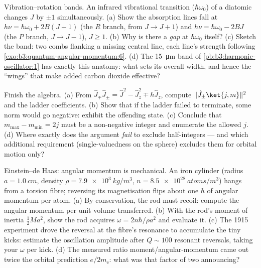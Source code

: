 \begin{exercise}[$\star\star\star$]\label{exo:b3:quantum-angular-momentum:10}
Vibration--rotation bands. An infrared vibrational transition
($\hbar\omega_0$) of a diatomic changes $J$ by $\pm1$
simultaneously. (a) Show the absorption lines fall at $h\nu =
\hbar\omega_0 + 2B(J+1)$ (the $R$ branch, from $J \to J+1$) and
$h\nu = \hbar\omega_0 - 2BJ$ (the $P$ branch, $J \to J-1$), $J \ge
1$. (b) Why is there a \emph{gap} at $\hbar\omega_0$ itself? (c)
Sketch the band: two combs flanking a missing central line, each
line's strength following
\cref{exo:b3:quantum-angular-momentum:6}. (d) The
\qty{15}{\micro m} band of \cref{pb:b3:harmonic-oscillator:1} has
exactly this anatomy: what sets its overall width, and hence the
``wings'' that make added carbon dioxide effective?
\end{exercise}

\begin{exercise}[$\star\star\star$]\label{exo:b3:quantum-angular-momentum:11}
Finish the algebra. (a) From $\hat J_\mp\hat J_\pm = \hat J^2 -
\hat J_z^2 \mp \hbar\hat J_z$, compute $\|\hat J_\pm\ket{j,m}\|^2$
and the ladder coefficients. (b) Show that if the ladder failed to
terminate, some norm would go negative: exhibit the offending state.
(c) Conclude that $m_{\max} - m_{\min} = 2j$ must be a non-negative
integer and enumerate the allowed $j$. (d) Where exactly does the
argument \emph{fail} to exclude half-integers --- and which
additional requirement (single-valuedness on the sphere) excludes
them for orbital motion only?
\end{exercise}

\begin{exercise}[$\star\star\star$]\label{exo:b3:quantum-angular-momentum:12}
Einstein--de Haas: angular momentum is mechanical. An iron cylinder
(radius $a = \qty{1.0}{cm}$, density $\rho = \qty{7.9e3}{kg/m^3}$,
$n = \qty{8.5e28}{atoms/m^3}$) hangs from a torsion fibre; reversing
its magnetisation flips about one $\hbar$ of angular momentum per
atom. (a) By conservation, the rod must recoil: compute the angular
momentum per unit volume transferred. (b) With the rod's moment of inertia $\tfrac12 M
a^2$, show the rod acquires $\omega = 2n\hbar/\rho a^2$ and evaluate
it. (c) The 1915 experiment drove the reversal at the fibre's
resonance to accumulate the tiny kicks: estimate the oscillation
amplitude after $Q \sim 100$ resonant reversals, taking your
$\omega$ per kick. (d) The measured ratio moment/angular-momentum
came out twice the orbital prediction $e/2m_{\text{e}}$: what was
that factor of two announcing?
\end{exercise}

